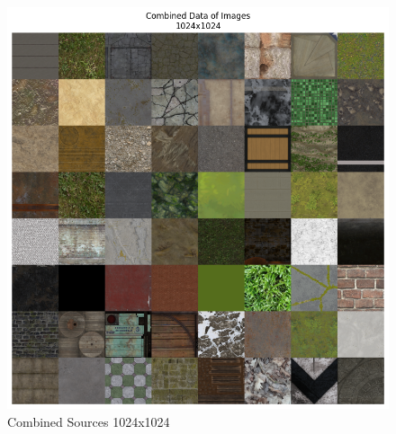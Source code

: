 \begin{figure}[H]
\begin{minipage}{.50\textwidth}
            \includegraphics[width=\linewidth]{../code/dataAnalysis/plots/exampleImgs/DataCombined1024x.png}
            \caption{Combined Sources 1024x1024}
            \label{fig:exmapleImgs1024}
        \end{minipage}
    \end{figure}

